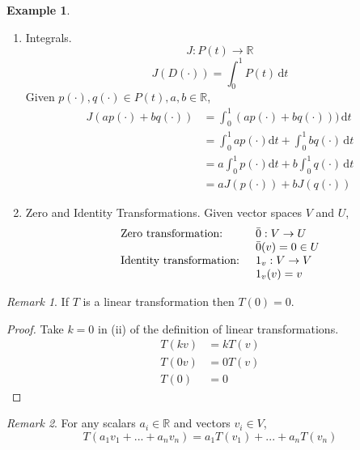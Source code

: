 \documentclass{report}
\theoremstyle{definition}
\newtheorem{ex}{Example}[section]
\theoremstyle{remark}
\newtheorem{_rem}{Remark}[section]
\begin{document}
\begin{ex}
\begin{enumerate}[1)]
  \[D:P(t)\rightarrow P(t)\]
  \[D(p(\cdot))=\frac{\mathrm{d}P}{\mathrm{d}t}(\cdot)\]
  For example, given $P(t)=1-t^2, D(P(t))=2t$.
 \item Integrals.
  \[J:P(t)\rightarrow \mathbb{R}\]
  \[J(D(\cdot))=\int_0^1 \! P(t) \, \mathrm{d}t\]
  Given $p(\cdot), q(\cdot)\in P(t), a, b\in \mathbb{R}$,
  \begin{align*}
   J(ap(\cdot)+bq(\cdot))&=\int_0^1 \! (ap(\cdot)+bq(\cdot))) \, \mathrm{d}t \\
   &=\int_0^1 \! ap(\cdot) \mathrm{d}t + \int_0^1 \! bq(\cdot) \, \mathrm{d}t \\
   &=a\int_0^1 \! p(\cdot) \mathrm{d}t + b\int_0^1 \! q(\cdot) \, \mathrm{d}t \\
   &=aJ(p(\cdot))+bJ(q(\cdot))
  \end{align*}
 \item Zero and Identity Transformations.
  Given vector spaces $V$ and $U$,
  \[\begin{array}{l l}
    \text{Zero transformation: }& \bar{0}: V\rightarrow U \\
    & \bar{0}(v)=0\in U \\
    \text{Identity transformation: }& 1_v: V\rightarrow V \\
    & 1_v(v)=v
    \end{array}\]
\end{enumerate}
\end{ex}

\begin{_rem}
If $T$ is a linear transformation then $T(0)=0$.
\end{_rem}
\begin{proof}
Take $k=0$ in (ii) of the definition of linear transformations.
\begin{align*}
T(kv)&=kT(v) \\
T(0v)&=0T(v) \\
T(0)&=0
\end{align*}
\end{proof}

\begin{_rem}
For any scalars $a_i\in \mathbb{R}$ and vectors $v_i\in V$,
\[T(a_1v_1+...+a_nv_n)=a_1T(v_1)+...+a_nT(v_n)\]
\end{_rem}
\end{document}
